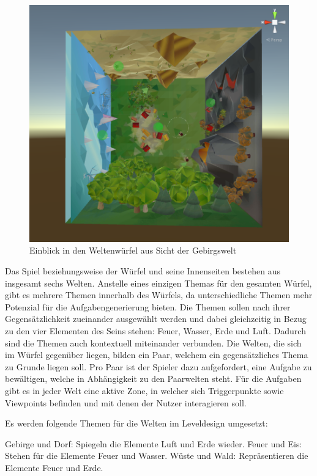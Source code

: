 
\begin{figure}[ht]%
	\centering
		\includegraphics[width=1.0\textwidth]{images/worlds}
	\caption{Einblick in den Weltenwürfel aus Sicht der Gebirgswelt}
	\label{fig:Worlds}
\end{figure}

Das Spiel beziehungsweise der Würfel und seine Innenseiten bestehen aus insgesamt sechs Welten. Anstelle eines einzigen Themas für den gesamten Würfel, gibt es mehrere Themen innerhalb des Würfels, da unterschiedliche Themen mehr Potenzial für die Aufgabengenerierung bieten. Die Themen sollen nach ihrer Gegensätzlichkeit zueinander ausgewählt werden und dabei gleichzeitig in Bezug zu den vier Elementen des Seins stehen: Feuer, Wasser, Erde und Luft. Dadurch sind die Themen auch kontextuell miteinander verbunden. Die Welten, die sich im Würfel gegenüber liegen, bilden ein Paar, welchem ein gegensätzliches Thema zu Grunde liegen soll. Pro Paar ist der Spieler dazu aufgefordert, eine Aufgabe zu bewältigen, welche in Abhängigkeit zu den Paarwelten steht. Für die Aufgaben gibt es in jeder Welt eine aktive Zone, in welcher sich Triggerpunkte sowie Viewpoints befinden und mit denen der Nutzer interagieren soll.

Es werden folgende Themen für die Welten im Leveldesign umgesetzt: 

Gebirge und Dorf: Spiegeln die Elemente Luft und Erde wieder. 
Feuer und Eis: Stehen für die Elemente Feuer und Wasser.
Wüste und Wald: Repräsentieren die Elemente Feuer und Erde.